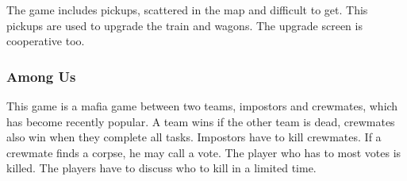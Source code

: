 \documentclass{article}
\begin{document}
\vspace{0.4cm}
The game includes pickups, scattered in the map and difficult to get. This pickups are used to upgrade the train and wagons. The upgrade screen is cooperative too.

\vfill
{}

\clearpage

\subsubsection{Among Us}
This game is a mafia game between two teams, impostors and crewmates, which has become recently popular. A team wins if the other team is dead, crewmates also win when they complete all tasks. Impostors have to kill crewmates. If a crewmate finds a corpse, he may call a vote. The player who has to most votes is killed. The players have to discuss who to kill in a limited time.

\vspace{0.4cm}
\end{document}

